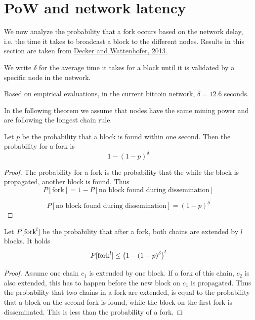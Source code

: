 \section{PoW and network latency}
\label{sec:fork}

We now analyze the probability that a fork occurs based on the network delay, i.e. the time it takes to broadcast a block to the different nodes.
Results in this section are taken from \href{https://www.gsd.inesc-id.pt/~ler/docencia/rcs1314/papers/P2P2013_041.pdf}{Decker and Wattenhofer, 2013.}

\begin{definition}
	We write $\delta$ for the average time it takes for a block until it is validated by a specific node in the network.
\end{definition}

\begin{note} Based on empirical evaluations, in the current bitcoin network, $\delta=12.6$ seconds. 
\end{note}

In the following theorem we assume that nodes have the same mining power and are following the longest chain rule.
\begin{theorem}
	\label{thm:fork}
	Let $p$ be the probability that a block is found within one second.
	Then the probability for a fork is
	\[
		1-(1-p)^\delta
	\]
\end{theorem}
\begin{proof}
The probability for a fork is the probability that the while the block is propagated, another block is found.
Thus $$P[\text{fork}] = 1- P[\text{no block found during dissemination}]$$

$$P[\text{no block found during dissemination}] = (1-p)^\delta$$
\end{proof}

\begin{cor}
\label{cor:longfork}
Let $P[\textnormal{fork}^l]$ be the probability that after a fork, both chains are extended by $l$ blocks. It holds
	\[
		P[\textnormal{fork}^l] \leq \left(1-(1-p)^\delta\right)^l
	\]
	
\end{cor}
\begin{proof}
Assume one chain $c_1$ is extended by one block. If a fork of this chain, $c_2$ is also extended, this has to happen before the new block on $c_1$ is propagated. Thus the probability that two chains in a fork are extended, is equal to the probability that a block on the second fork is found, while the block on the first fork is disseminated. This is less than the probability of a fork.
\end{proof}

